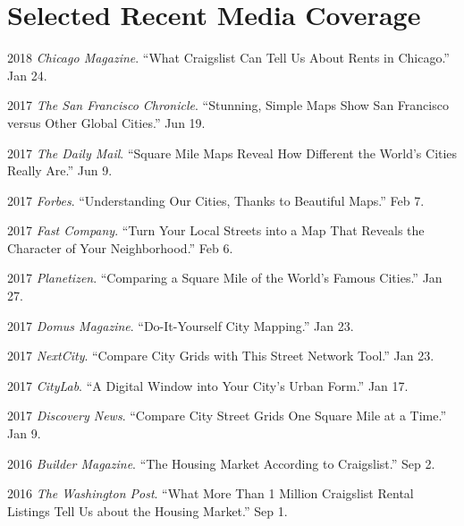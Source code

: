 \documentclass{academiccv}
\begin{document}
\section*{Selected Recent Media Coverage}

\begin{tablist}
	
\item 2018 \tab \textit{Chicago Magazine}. \enquote{What Craigslist Can Tell Us About Rents in Chicago.} Jan 24.
	
\item 2017 \tab \textit{The San Francisco Chronicle}. \enquote{Stunning, Simple Maps Show San Francisco versus Other Global Cities.} Jun 19.

\item 2017 \tab \textit{The Daily Mail}. \enquote{Square Mile Maps Reveal How Different the World's Cities Really Are.} Jun 9.

\item 2017 \tab \textit{Forbes}. \enquote{Understanding Our Cities, Thanks to Beautiful Maps.} Feb 7.

\item 2017 \tab \textit{Fast Company}. \enquote{Turn Your Local Streets into a Map That Reveals the Character of Your Neighborhood.} Feb 6.

\item 2017 \tab \textit{Planetizen}. \enquote{Comparing a Square Mile of the World's Famous Cities.} Jan 27.

\item 2017 \tab \textit{Domus Magazine}. \enquote{Do-It-Yourself City Mapping.} Jan 23.

\item 2017 \tab \textit{NextCity}. \enquote{Compare City Grids with This Street Network Tool.} Jan 23.

\item 2017 \tab \textit{CityLab}. \enquote{A Digital Window into Your City's Urban Form.} Jan 17.

\item 2017 \tab \textit{Discovery News}. \enquote{Compare City Street Grids One Square Mile at a Time.} Jan 9.

\item 2016 \tab \textit{Builder Magazine}. \enquote{The Housing Market According to Craigslist.} Sep 2.

\item 2016 \tab \textit{The Washington Post}. \enquote{What More Than 1 Million Craigslist Rental Listings Tell Us about the Housing Market.} Sep 1.


\end{tablist}
\end{document}
